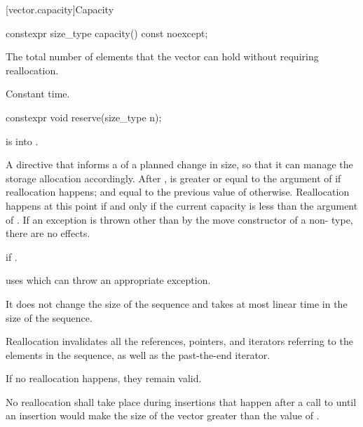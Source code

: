 [vector.capacity]{Capacity}

%
\begin{itemdecl}
constexpr size_type capacity() const noexcept;
\end{itemdecl}

\begin{itemdescr}
\pnum
\returns
The total number of elements that the vector can hold
without requiring reallocation.

\pnum
\complexity
Constant time.
\end{itemdescr}

%
\begin{itemdecl}
constexpr void reserve(size_type n);
\end{itemdecl}

\begin{itemdescr}
\pnum
\expects
{} is  into .

\pnum
\effects
A directive that informs a
of a planned change in size, so that it can manage the storage allocation accordingly.
After
,
is greater or equal to the argument of
if reallocation happens; and equal to the previous value of
otherwise.
Reallocation happens at this point if and only if the current capacity is less than the
argument of
. If an exception is thrown
other than by the move constructor of a non- type,
there are no effects.

\pnum
\throws
{} if .
\begin{footnote}
 uses  which
can throw an appropriate exception.
\end{footnote}

\pnum
\complexity
It does not change the size of the sequence and takes at most linear
time in the size of the sequence.

\pnum
\remarks
Reallocation invalidates all the references, pointers, and iterators
referring to the elements in the sequence, as well as the past-the-end iterator.
\begin{note}
If no reallocation happens, they remain valid.
\end{note}
No reallocation shall take place during insertions that happen
after a call to 
until an insertion would make the size of the vector
greater than the value of .
\end{itemdescr}

